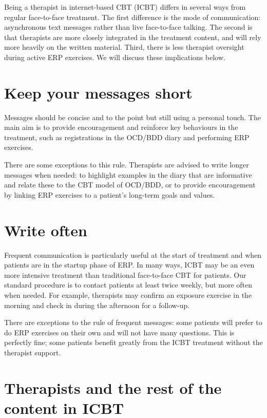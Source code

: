 \documentclass[]{book}
\theoremstyle{definition}
\theoremstyle{definition}
\theoremstyle{definition}
\theoremstyle{remark}
\begin{document}
Being a therapist in internet-based CBT (ICBT) differs in several ways
from regular face-to-face treatment. The first difference is the mode of
communication: asynchronous text messages rather than live face-to-face
talking. The second is that therapists are more closely integrated in
the treatment content, and will rely more heavily on the written
material. Third, there is less therapist oversight during active ERP
exercises. We will discuss these implications below.

\hypertarget{keep-your-messages-short}{%
\section{Keep your messages short}\label{keep-your-messages-short}}

Messages should be concise and to the point but still using a personal
touch. The main aim is to provide encouragement and reinforce key
behaviours in the treatment, such as registrations in the OCD/BDD diary
and performing ERP exercises.

There are some exceptions to this rule. Therapists are advised to write
longer messages when needed: to highlight examples in the diary that are
informative and relate these to the CBT model of OCD/BDD, or to provide
encouragement by linking ERP exercises to a patient's long-term goals
and values.

\hypertarget{write-often}{%
\section{Write often}\label{write-often}}

Frequent communication is particularly useful at the start of treatment
and when patients are in the startup phase of ERP. In many ways, ICBT
may be an even more intensive treatment than traditional face-to-face
CBT for patients. Our standard procedure is to contact patients at least
twice weekly, but more often when needed. For example, therapists may
confirm an exposure exercise in the morning and check in during the
afternoon for a follow-up.

There are exceptions to the rule of frequent messages: some patients
will prefer to do ERP exercises on their own and will not have many
questions. This is perfectly fine; some patients benefit greatly from
the ICBT treatment without the therapist support.

\hypertarget{therapists-and-the-rest-of-the-content-in-icbt}{%
\section{Therapists and the rest of the content in
ICBT}\label{therapists-and-the-rest-of-the-content-in-icbt}}
\end{document}
